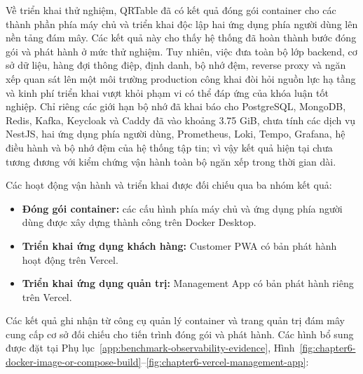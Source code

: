 Về triển khai thử nghiệm, QRTable đã có kết quả đóng gói container cho các thành phần phía máy chủ và triển khai độc lập hai ứng dụng phía người dùng lên nền tảng đám mây. Các kết quả này cho thấy hệ thống đã hoàn thành bước đóng gói và phát hành ở mức thử nghiệm. Tuy nhiên, việc đưa toàn bộ lớp backend, cơ sở dữ liệu, hàng đợi thông điệp, định danh, bộ nhớ đệm, reverse proxy và ngăn xếp quan sát lên một môi trường production công khai đòi hỏi nguồn lực hạ tầng và kinh phí triển khai vượt khỏi phạm vi có thể đáp ứng của khóa luận tốt nghiệp. Chỉ riêng các giới hạn bộ nhớ đã khai báo cho PostgreSQL, MongoDB, Redis, Kafka, Keycloak và Caddy đã vào khoảng 3.75 GiB, chưa tính các dịch vụ NestJS, hai ứng dụng phía người dùng, Prometheus, Loki, Tempo, Grafana, hệ điều hành và bộ nhớ đệm của hệ thống tập tin; vì vậy kết quả hiện tại chưa tương đương với kiểm chứng vận hành toàn bộ ngăn xếp trong thời gian dài.

Các hoạt động vận hành và triển khai được đối chiếu qua ba nhóm kết quả:
\begin{itemize}
  \item \textbf{Đóng gói container:} các cấu hình phía máy chủ và ứng dụng phía người dùng được xây dựng thành công trên Docker Desktop.
  \item \textbf{Triển khai ứng dụng khách hàng:} Customer PWA có bản phát hành hoạt động trên Vercel.
  \item \textbf{Triển khai ứng dụng quản trị:} Management App có bản phát hành riêng trên Vercel.
\end{itemize}

Các kết quả ghi nhận từ công cụ quản lý container và trang quản trị đám mây cung cấp cơ sở đối chiếu cho tiến trình đóng gói và phát hành. Các hình bổ sung được đặt tại Phụ lục~\ref{app:benchmark-observability-evidence}, Hình~\ref{fig:chapter6-docker-image-or-compose-build}--\ref{fig:chapter6-vercel-management-app}:

